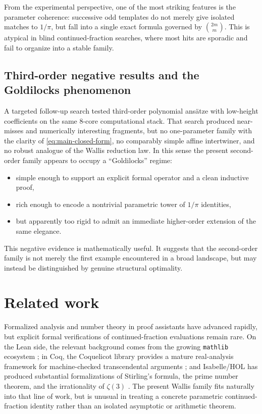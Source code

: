 \documentclass[11pt,reqno]{amsart}
\theoremstyle{plain}
\theoremstyle{definition}
\theoremstyle{remark}
\begin{document}
From the experimental perspective, one of the most striking features is the parameter coherence: successive odd templates do not merely give isolated matches to $1/\pi$, but fall into a single exact formula governed by $\binom{2m}{m}$.  This is atypical in blind continued-fraction searches, where most hits are sporadic and fail to organize into a stable family.

\subsection{Third-order negative results and the Goldilocks phenomenon}

A targeted follow-up search tested third-order polynomial ansätze with low-height coefficients on the same 8-core computational stack.  That search produced near-misses and numerically interesting fragments, but no one-parameter family with the clarity of \eqref{eq:main-closed-form}, no comparably simple affine intertwiner, and no robust analogue of the Wallis reduction law.  In this sense the present second-order family appears to occupy a ``Goldilocks'' regime:
\begin{itemize}
  \item simple enough to support an explicit formal operator and a clean inductive proof,
  \item rich enough to encode a nontrivial parametric tower of $1/\pi$ identities,
  \item but apparently too rigid to admit an immediate higher-order extension of the same elegance.
\end{itemize}

This negative evidence is mathematically useful.  It suggests that the second-order family is not merely the first example encountered in a broad landscape, but may instead be distinguished by genuine structural optimality.

\section{Related work}\label{sec:related}

Formalized analysis and number theory in proof assistants have advanced rapidly, but explicit formal verifications of continued-fraction evaluations remain rare.  On the Lean side, the relevant background comes from the growing \texttt{mathlib} ecosystem \cite{mathlib2020}; in Coq, the Coquelicot library provides a mature real-analysis framework for machine-checked transcendental arguments \cite{boldo2015coquelicot}; and Isabelle/HOL has produced substantial formalizations of Stirling's formula, the prime number theorem, and the irrationality of $\zeta(3)$ \cite{eberl2016stirling,eberl2018pnt,eberl2019zeta3}.  The present Wallis family fits naturally into that line of work, but is unusual in treating a concrete parametric continued-fraction identity rather than an isolated asymptotic or arithmetic theorem.
\end{document}
